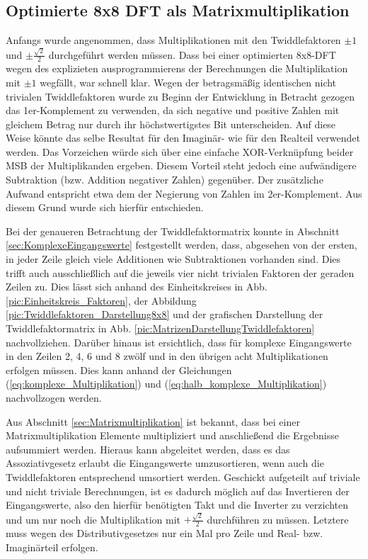 \subsection{Optimierte 8x8 DFT als Matrixmultiplikation}\label{sec:OptimierteMatrixmultiplikation}
Anfangs wurde angenommen, dass Multiplikationen mit den Twiddlefaktoren $\pm 1$ und $\pm\frac{\sqrt{2}}{2}$ durchgeführt werden müssen. 
Dass bei einer optimierten 8x8-DFT wegen des explizieten ausprogrammierens der Berechnungen die Multiplikation mit $\pm1$ wegfällt, war schnell klar.
Wegen der betragsmäßig identischen nicht trivialen Twiddlefaktoren wurde zu Beginn der Entwicklung in Betracht gezogen das 1er-Komplement zu verwenden, da sich negative und positive Zahlen mit gleichem Betrag nur durch ihr höchstwertigstes 
Bit unterscheiden. Auf diese Weise könnte das selbe Resultat für den Imaginär- wie für den Realteil verwendet werden. Das Vorzeichen würde sich über eine 
einfache XOR-Verknüpfung beider MSB der Multiplikanden ergeben.
Diesem Vorteil steht jedoch eine aufwändigere Subtraktion (bzw. Addition negativer Zahlen) gegenüber. Der zusätzliche Aufwand entspricht 
etwa dem der Negierung von Zahlen im 2er-Komplement. Aus diesem Grund wurde sich hierfür entschieden.

Bei der genaueren Betrachtung der Twiddlefaktormatrix konnte in Abschnitt \ref{sec:KomplexeEingangswerte} festgestellt werden, dass, abgesehen von der ersten, in jeder Zeile gleich viele Additionen wie Subtraktionen vorhanden sind. Dies trifft auch ausschließlich auf die jeweils vier nicht trivialen Faktoren der geraden Zeilen zu. 
Dies lässt sich anhand des Einheitskreises in Abb. \ref{pic:Einheitskreis_Faktoren}, der Abbildung \ref{pic:Twiddlefaktoren_Darstellung8x8}
 und der grafischen Darstellung der Twiddlefaktormatrix in Abb. \ref{pic:MatrizenDarstellungTwiddlefaktoren} nachvollziehen. 
 Darüber hinaus ist ersichtlich, dass für komplexe Eingangswerte in den Zeilen 2, 4, 6 und 8 zwölf und in den übrigen acht Multiplikationen erfolgen müssen. Dies kann anhand der 
 Gleichungen (\ref{eq:komplexe_Multiplikation}) und (\ref{eq:halb_komplexe_Multiplikation}) nachvollzogen werden.
 
Aus Abschnitt \ref{sec:Matrixmultiplikation} ist bekannt, dass bei einer Matrixmultiplikation Elemente multipliziert und anschließend die Ergebnisse 
 aufsummiert werden.
 Hieraus kann abgeleitet werden, dass es das Assoziativgesetz erlaubt die Eingangswerte umzusortieren, wenn auch die Twiddlefaktoren entsprechend umsortiert werden. 
Geschickt aufgeteilt auf triviale und nicht triviale Berechnungen, 
ist es dadurch möglich auf das Invertieren der Eingangswerte, also den hierfür benötigten Takt und die Inverter zu verzichten und um nur noch die Multiplikation
mit $+\frac{\sqrt{2}}{2}$ durchführen zu müssen. Letztere muss wegen des Distributivgesetzes nur ein Mal pro Zeile und Real- bzw. Imaginärteil erfolgen.

